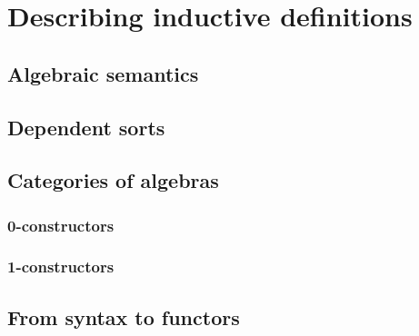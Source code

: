\chapter{Describing inductive definitions}

\section{Algebraic semantics}



\section{Dependent sorts}



\section{Categories of algebras}

\subsection{0-constructors}

\subsection{1-constructors}


\section{From syntax to functors}

